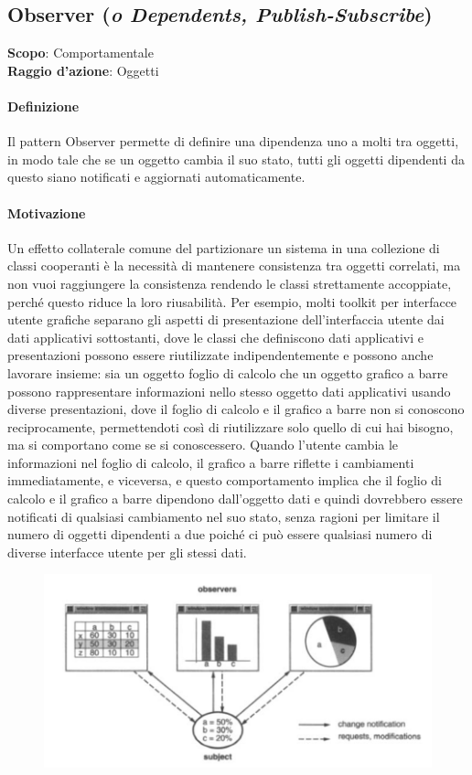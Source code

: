 \subsection{Observer (\textit{o Dependents, Publish-Subscribe})}
\label{observer}

\textbf{Scopo}: Comportamentale \\
\textbf{Raggio d'azione}: Oggetti

\paragraph{Definizione} Il pattern Observer permette di definire una dipendenza uno a molti tra oggetti, in modo tale che se un oggetto cambia il suo stato, tutti gli oggetti dipendenti da questo siano notificati e aggiornati automaticamente.

\paragraph{Motivazione} Un effetto collaterale comune del partizionare un sistema in una collezione di classi cooperanti è la necessità di mantenere consistenza tra oggetti correlati, ma non vuoi raggiungere la consistenza rendendo le classi strettamente accoppiate, perché questo riduce la loro riusabilità. Per esempio, molti toolkit per interfacce utente grafiche separano gli aspetti di presentazione dell'interfaccia utente dai dati applicativi sottostanti, dove le classi che definiscono dati applicativi e presentazioni possono essere riutilizzate indipendentemente e possono anche lavorare insieme: sia un oggetto foglio di calcolo che un oggetto grafico a barre possono rappresentare informazioni nello stesso oggetto dati applicativi usando diverse presentazioni, dove il foglio di calcolo e il grafico a barre non si conoscono reciprocamente, permettendoti così di riutilizzare solo quello di cui hai bisogno, ma si comportano come se si conoscessero. Quando l'utente cambia le informazioni nel foglio di calcolo, il grafico a barre riflette i cambiamenti immediatamente, e viceversa, e questo comportamento implica che il foglio di calcolo e il grafico a barre dipendono dall'oggetto dati e quindi dovrebbero essere notificati di qualsiasi cambiamento nel suo stato, senza ragioni per limitare il numero di oggetti dipendenti a due poiché ci può essere qualsiasi numero di diverse interfacce utente per gli stessi dati.

\begin{figure}[H]
    \centering
    \includegraphics[width=0.5\linewidth]{assets/pattern/observer/observer-esempio.png}
\end{figure}

